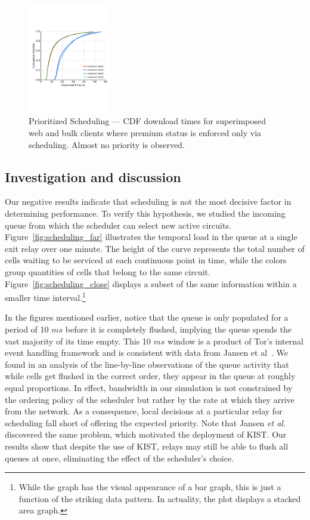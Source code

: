\begin{figure} \centering
  \includegraphics[trim={0 3cm 0 3cm}, clip,
    width=0.32\textwidth]{images/scheduling_priority.pdf}
  \caption[Prioritized Scheduling]{Prioritized Scheduling --- CDF download times
    for superimposed web and bulk clients where premium status is enforced only
    via scheduling. Almost no priority is observed.}
  \label{fig:scheduling_priority}
\end{figure}

\subsection{Investigation and discussion}

Our negative results indicate that scheduling is not the most decisive factor in determining performance.
To verify this hypothesis, we studied the incoming queue from which the scheduler can select new active circuits.
Figure~\ref{fig:scheduling_far} illustrates the temporal load in the queue at a single exit relay over one minute.
The height of the curve represents the total number of cells waiting to be serviced at each continuous point in time, while the colors group quantities of cells that belong to the same circuit.
Figure~\ref{fig:scheduling_close} displays a subset of the same information within a smaller time interval.\footnote{While the graph has the visual appearance of a bar graph, this is just a function of the striking data pattern.
In actuality, the plot displays a stacked area graph.}

In the figures mentioned earlier, notice that the queue is only populated for a period of 10 $ms$ before it is completely flushed, implying the queue spends the vast majority of its time empty.
This 10 $ms$ window is a product of Tor's internal event handling framework and is consistent with data from Jansen et al~\cite{jansen2018kist}.
We found in an analysis of the line-by-line observations of the queue activity that while cells get flushed in the correct order, they appear in the queue at roughly equal proportions.
In effect, bandwidth in our simulation is not constrained by the ordering policy of the scheduler but rather by the rate at which they arrive from the network.
As a consequence, local decisions at a particular relay for scheduling fall short of offering the expected priority.
Note that Jansen \textit{et al.}~\cite{jansen2018kist} discovered the same problem, which motivated the deployment of KIST.
Our results show that despite the use of KIST, relays may still be able to flush all queues at once, eliminating the effect of the scheduler's choice.

